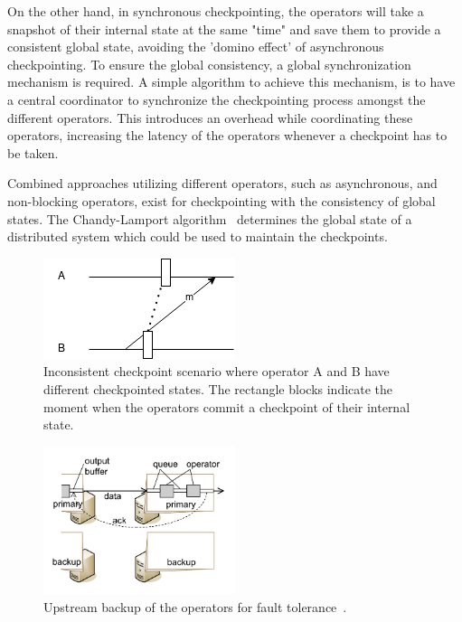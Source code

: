 On the other hand, in synchronous checkpointing, the operators will take a snapshot 
of their internal state at the same "time" and save them to provide a consistent 
global state, avoiding the 'domino effect' of asynchronous checkpointing. To ensure 
the global consistency, a global synchronization mechanism is required. A simple 
algorithm to achieve this mechanism, is to have a central coordinator to synchronize 
the checkpointing process amongst the different operators. This introduces an overhead 
while coordinating these operators, increasing the latency of the operators whenever a 
checkpoint has to be taken. 


Combined approaches utilizing different operators, such as asynchronous, and non-blocking
operators, exist for checkpointing with the consistency of global states. 
The Chandy-Lamport algorithm~\cite{chandy_lamport} determines the 
global state of a distributed system which could be used to maintain the checkpoints. 

\begin{figure}[!htbp]
    \centering
    \includegraphics{fig/checkpoint_inconsistency.png}
    \caption[Inconsistent checkpoint scenario]
    {Inconsistent checkpoint scenario where operator A and B have different
    checkpointed states. The rectangle blocks indicate the moment when the operators 
    commit a checkpoint of their internal state. }
    \label{fig:checkpoint_inconsistency}
\end{figure}


\begin{figure}[!htbp]
    \centering
    \includegraphics[width=0.5\textwidth]{fig/upstream.png}
    \caption{Upstream backup of the operators for fault tolerance~\cite{upstream_backup}.}
    \label{fig:upstream}
    
\end{figure}

